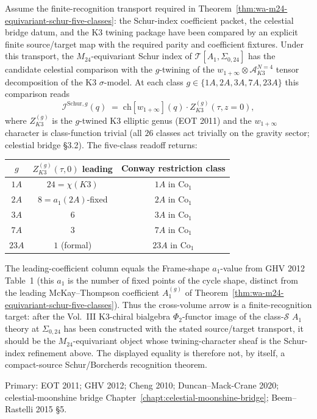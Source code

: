 \begin{remark}%
\label{rem:wa-classS-celestial}%
Assume the finite-recognition transport required in
Theorem~\ref{thm:wa-m24-equivariant-schur-five-classes}: the Schur-index
coefficient packet, the celestial bridge datum, and the K3 twining
package have been compared by an explicit finite source/target map with
the required parity and coefficient fixtures.  Under this transport, the
$M_{24}$-equivariant Schur index of $\mathcal T[A_1,\Sigma_{0, 24}]$
has the candidate celestial comparison with the $g$-twining of the
$w_{1+\infty} \otimes \mathcal A^{N=4}_{K3}$ tensor decomposition of the
K3 $\sigma$-model. At each class
$g \in \{1A, 2A, 3A, 7A, 23A\}$ this comparison reads
\[
 \mathcal I^{\mathrm{Schur}, g}(q)
 \;=\; \mathrm{ch}[w_{1+\infty}](q) \cdot
 Z_{K3}^{(g)}(\tau, z=0),
\]
where $Z_{K3}^{(g)}$ is the $g$-twined K3 elliptic genus
(EOT 2011) and the $w_{1+\infty}$ character is class-function
trivial (all $26$ classes act trivially on the gravity
sector; celestial bridge \S 3.2). The five-class readoff
returns:
\begin{center}
\begin{tabular}{c|c|c}
$g$ & $Z_{K3}^{(g)}(\tau, 0)$ leading & Conway restriction class \\\hline
$1A$ & $24 = \chi(K3)$ & $1A$ in $\mathrm{Co}_1$ \\
$2A$ & $8 = a_1(2A)$-fixed & $2A$ in $\mathrm{Co}_1$ \\
$3A$ & $6$ & $3A$ in $\mathrm{Co}_1$ \\
$7A$ & $3$ & $7A$ in $\mathrm{Co}_1$ \\
$23A$ & $1$ (formal) & $23A$ in $\mathrm{Co}_1$ \\
\end{tabular}
\end{center}
The leading-coefficient column equals the Frame-shape
$a_1$-value from GHV 2012 Table~1 (this $a_1$ is the number
of fixed points of the cycle shape, distinct from the
leading McKay--Thompson coefficient $A_1^{(g)}$ of
Theorem~\ref{thm:wa-m24-equivariant-schur-five-classes}).
Thus the cross-volume arrow is a finite-recognition target: after the
Vol.~III K3-chiral bialgebra $\Phi_2$-functor image of the
class-$\mathcal S$ $A_1$ theory at $\Sigma_{0, 24}$ has been constructed
with the stated source/target transport, it should be the
$M_{24}$-equivariant object whose twining-character sheaf is the
Schur-index refinement above.  The displayed equality is therefore not,
by itself, a compact-source Schur/Borcherds recognition theorem.

Primary: EOT 2011; GHV 2012; Cheng 2010;
Duncan--Mack-Crane 2020; celestial-moonshine bridge
Chapter~\ref{chapt:celestial-moonshine-bridge};
Beem--Rastelli 2015 \S 5.
\end{remark}
